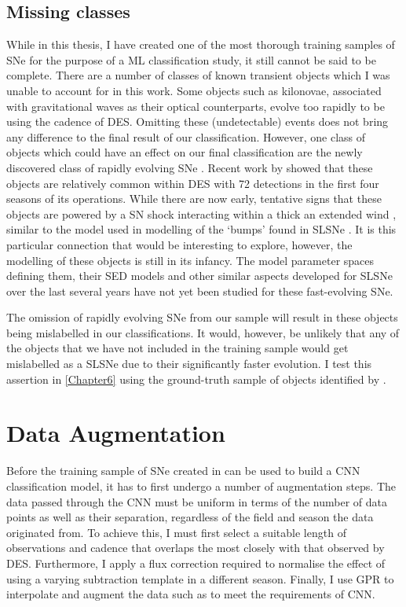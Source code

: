 \subsection{Missing classes}
While in this thesis, I have created one of the most thorough training samples of SNe for the purpose of a ML classification study, it still cannot be said to be complete. There are a number of classes of known transient objects which I was unable to account for in this work. Some objects such as kilonovae, associated with gravitational waves as their optical counterparts, evolve too rapidly to be using the cadence of DES. Omitting these (undetectable) events does not bring any difference to the final result of our classification. However, one class of objects which could have an effect on our final classification are the newly discovered class of rapidly evolving SNe \cite{Drout2014,Kepler2018}. Recent work by \citet{Pursiainen2018} showed that these objects are relatively common within DES with 72 detections in the first four seasons of its operations. While there are now early, tentative signs \citep{Pursiainen2018} that these objects are powered by a SN shock interacting within a thick an extended wind \citep{Piro2015}, similar to the model used in modelling of the `bumps' found in SLSNe . It is this particular connection that would be interesting to explore, however, the modelling of these objects is still in its infancy. The model parameter spaces defining them, their SED models and other similar aspects developed for SLSNe over the last several years have not yet been studied for these fast-evolving SNe.

The omission of rapidly evolving SNe from our sample will result in these objects being mislabelled in our classifications. It would, however, be unlikely that any of the objects that we have not included in the training sample would get mislabelled as a SLSNe due to their significantly faster evolution. I test this assertion in \cref{Chapter6} using the ground-truth sample of objects identified by \citet{Pursiainen2018}.

\section{Data Augmentation} \label{sec:DataAugmentation}
Before the training sample of SNe created in  can be used to build a CNN classification model, it has to first undergo a number of augmentation steps. The data passed through the CNN must be uniform in terms of the number of data points as well as their separation, regardless of the field and season the data originated from. To achieve this, I must first select a suitable length of observations and cadence that overlaps the most closely with that observed by DES. Furthermore, I apply a flux correction required to normalise the effect of using a varying subtraction template in a different season. Finally, I use GPR to interpolate and augment the data such as to meet the requirements of CNN.

